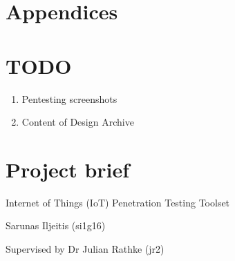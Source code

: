 \documentclass{article}
\begin{document}



\newpage
\tableofcontents

\newpage



\newpage









% 
\newpage


\section{Appendices}
\appendix


\section{TODO}
\begin{enumerate}
	\item Pentesting screenshots
	\item Content of Design Archive
\end{enumerate}


\section{Project brief}\label{sec:appendix-preject-brief}

Internet of Things (IoT) Penetration Testing Toolset

Sarunas Iljeitis (si1g16)

Supervised by Dr Julian Rathke (jr2)
\end{document}
